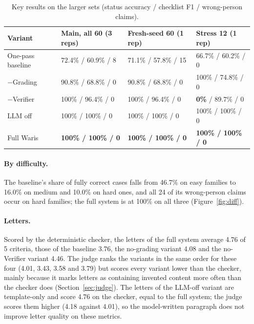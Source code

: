 \begin{table}[H]
\centering\small{}
\caption[Key results on the larger sets]{Key results on the larger sets (status accuracy / checklist F1 / wrong-person claims).}\label{tab:sets}
\renewcommand{\arraystretch}{1.1}
\begin{tabularx}{\linewidth}{@{}p{3.3cm}XXX@{}}
\toprule
\textbf{Variant} & \textbf{Main, all 60 (3 reps)} & \textbf{Fresh-seed 60 (1 rep)} & \textbf{Stress 12 (1 rep)} \\ \midrule
One-pass baseline & 72.4\% / 60.9\% / 8 & 71.1\% / 57.8\% / 15 & 66.7\% / 60.2\% / 0 \\
$-$Grading & 90.8\% / 68.8\% / 0 & 90.8\% / 68.8\% / 0 & 100\% / 74.8\% / 0 \\
$-$Verifier & 100\% / 96.4\% / 0 & 100\% / 96.4\% / 0 & \textbf{0\%} / 89.7\% / 0 \\
LLM off & 100\% / 100\% / 0 & 100\% / 100\% / 0 & 100\% / 100\% / 0 \\
Full Waris & \textbf{100\% / 100\% / 0} & \textbf{100\% / 100\% / 0} & \textbf{100\% / 100\% / 0} \\ \bottomrule
\end{tabularx}
\end{table}

\paragraph{By difficulty.} The baseline's share of fully correct cases falls from 46.7\% on easy families to 16.0\% on medium and 10.0\% on hard ones, and all 24 of its wrong-person claims occur on hard families; the full system is at 100\% on all three (Figure~\ref{fig:diff}).

\paragraph{Letters.} Scored by the deterministic checker, the letters of the full system average 4.76 of 5 criteria, those of the baseline 3.76, the no-grading variant 4.08 and the no-Verifier variant 4.46. The judge ranks the variants in the same order for these four (4.01, 3.43, 3.58 and 3.79) but scores every variant lower than the checker, mainly because it marks letters as containing invented content more often than the checker does (Section~\ref{sec:judge}). The letters of the LLM-off variant are template-only and score 4.76 on the checker, equal to the full system; the judge scores them higher (4.18 against 4.01), so the model-written paragraph does not improve letter quality on these metrics.

